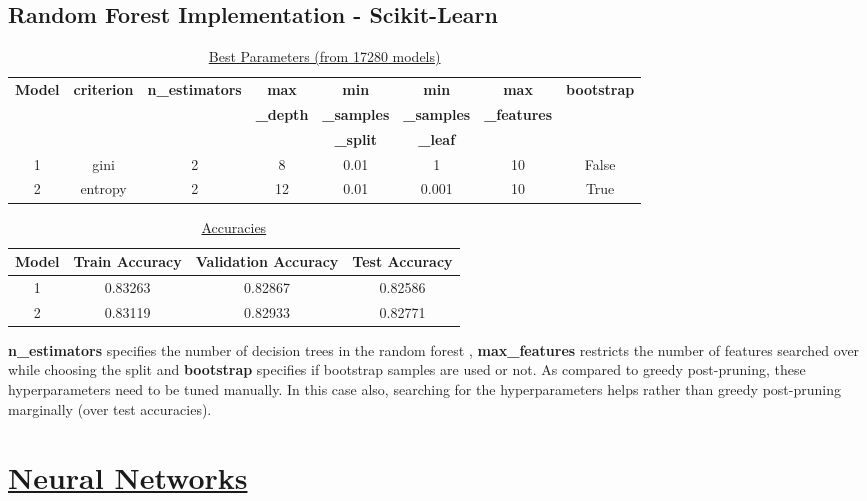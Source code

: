 \documentclass[12pt]{article}
\begin{document}
\subsection*{Random Forest Implementation - Scikit-Learn}
\vspace{-7mm}
\begin{table}[h!]
\begin{center}
\caption{\underline{Best Parameters (from 17280 models)}}
\vspace{1mm}
\label{tab:table2}
\begin{tabular}{|c|c|c|c|c|c|c|c|}
\hline
\textbf{Model} & \textbf{criterion} & \textbf{n\_estimators} & \textbf{max} & \textbf{min} & \textbf{min} & \textbf{max} & \textbf{bootstrap} \\
&  &  & \textbf{\_depth} & \textbf{\_samples} & \textbf{\_samples} & \textbf{\_features} & \\
&  &  &  & \textbf{\_split} & \textbf{\_leaf} &  & \\
\hline
1 & gini & 2 & 8 & 0.01 & 1 & 10 & False\\
2 & entropy & 2 & 12 & 0.01 & 0.001 & 10 & True\\
\hline
\end{tabular}
\end{center}
\end{table}
\begin{table}[h!]
\begin{center}
\caption{\underline{Accuracies}}
\vspace{1mm}
\label{tab:table3}
\begin{tabular}{|c|c|c|c|}
\hline
\textbf{Model} & \textbf{Train Accuracy} & \textbf{Validation Accuracy} & \textbf{Test Accuracy} \\
\hline
1 & 0.83263 & 0.82867 & 0.82586 \\
2 & 0.83119 & 0.82933 & 0.82771 \\
\hline
\end{tabular}
\end{center}
\end{table}
\vspace{-5mm}
\begin{addmargin}[0.3in]{0in}
\textbf{n\_estimators} specifies the number of decision trees in the random forest , \textbf{max\_features} restricts the number of features searched over while choosing the split and \textbf{bootstrap} specifies if bootstrap samples are used or not. As compared to greedy post-pruning, these hyperparameters need to be tuned manually. In this case also, searching for the hyperparameters helps rather than greedy post-pruning marginally (over test accuracies).
\end{addmargin}

\section*{\underline{Neural Networks}}
\end{document}
